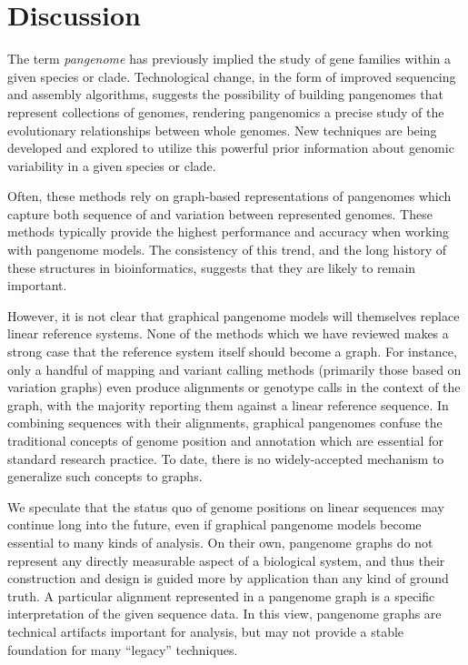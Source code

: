 \section{Discussion}

The term \emph{pangenome} has previously implied the study of gene families within a given species or clade.
Technological change, in the form of improved sequencing and assembly algorithms, suggests the possibility of building pangenomes that represent collections of genomes, rendering pangenomics a precise study of the evolutionary relationships between whole genomes.
New techniques are being developed and explored to utilize this powerful prior information about genomic variability in a given species or clade.

Often, these methods rely on graph-based representations of pangenomes which capture both sequence of and variation between represented genomes.
These methods typically provide the highest performance and accuracy when working with pangenome models.
The consistency of this trend, and the long history of these structures in bioinformatics, suggests that they are likely to remain important.

However, it is not clear that graphical pangenome models will themselves replace linear reference systems.
None of the methods which we have reviewed makes a strong case that the reference system itself should become a graph.
For instance, only a handful of mapping and variant calling methods (primarily those based on variation graphs) even produce alignments or genotype calls in the context of the graph, with the majority reporting them against a linear reference sequence.
In combining sequences with their alignments, graphical pangenomes confuse the traditional concepts of genome position and annotation which are essential for standard research practice.
To date, there is no widely-accepted mechanism to generalize such concepts to graphs.

We speculate that the status quo of genome positions on linear sequences may continue long into the future, even if graphical pangenome models become essential to many kinds of analysis.
On their own, pangenome graphs do not represent any directly measurable aspect of a biological system, and thus their construction and design is guided more by application than any kind of ground truth.
A particular alignment represented in a pangenome graph is a specific interpretation of the given sequence data.
In this view, pangenome graphs are technical artifacts important for analysis, but may not provide a stable foundation for many ``legacy'' techniques.

